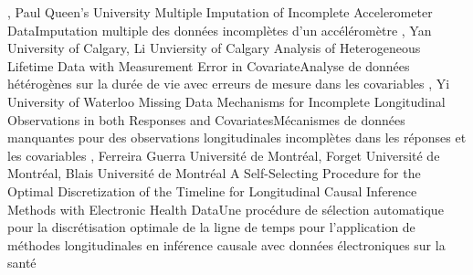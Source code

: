 {
,  {Paul}
{Queen's University}
}
{Multiple Imputation of Incomplete Accelerometer Data}{Imputation multiple des données incomplètes d’un accéléromètre}
{\bubbleE \enspace \screenE}
{
,  {Yan}
{University of Calgary},  {Li}
{Unviersity of Calgary}
}
{Analysis of Heterogeneous Lifetime Data with Measurement Error in Covariate}{Analyse de données hétérogènes sur la durée de vie avec erreurs de mesure dans les covariables}
{\bubbleE \enspace \screenE}
{
,  {Yi}
{University of Waterloo}
}
{Missing Data Mechanisms for Incomplete Longitudinal Observations in both Responses and Covariates}{Mécanismes de données manquantes pour des observations longitudinales incomplètes dans les réponses et les covariables}
{\bubbleE \enspace \screenE}
{
,  {Ferreira Guerra}
{Université de Montréal},  {Forget}
{Université de Montréal},  {Blais}
{Université de Montréal}
}
{A Self-Selecting Procedure for the Optimal Discretization of the Timeline for Longitudinal Causal Inference Methods with Electronic Health Data}{Une procédure de sélection automatique pour la discrétisation optimale de la ligne de temps pour l'application de méthodes longitudinales en inférence causale avec données électroniques sur la santé}
{\bubbleE \enspace \screenE}




